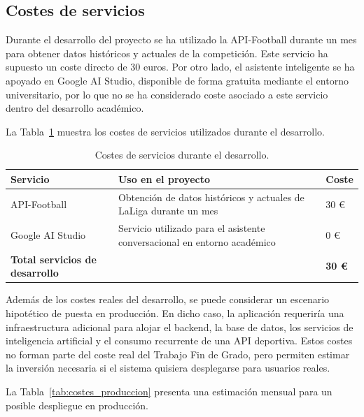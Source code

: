 \subsection{Costes de servicios}

Durante el desarrollo del proyecto se ha utilizado la API-Football durante un mes para obtener datos históricos y actuales de la competición. Este servicio ha supuesto un coste directo de 30 euros. Por otro lado, el asistente inteligente se ha apoyado en Google AI Studio, disponible de forma gratuita mediante el entorno universitario, por lo que no se ha considerado coste asociado a este servicio dentro del desarrollo académico.

La Tabla~\ref{tab:costes_servicios_desarrollo} muestra los costes de servicios utilizados durante el desarrollo.

\begin{table}[H]
\centering
\caption{Costes de servicios durante el desarrollo.}
\label{tab:costes_servicios_desarrollo}
\renewcommand{\arraystretch}{1.2}
\begin{tabular}{|p{6cm}|p{6cm}|p{3cm}|}
\hline
\textbf{Servicio} & \textbf{Uso en el proyecto} & \textbf{Coste} \\ \hline

API-Football &
Obtención de datos históricos y actuales de LaLiga durante un mes &
30 \euro \\ \hline

Google AI Studio &
Servicio utilizado para el asistente conversacional en entorno académico &
0 \euro \\ \hline

\textbf{Total servicios de desarrollo} &
&
\textbf{30 \euro} \\ \hline

\end{tabular}
\end{table}

Además de los costes reales del desarrollo, se puede considerar un escenario hipotético de puesta en producción. En dicho caso, la aplicación requeriría una infraestructura adicional para alojar el backend, la base de datos, los servicios de inteligencia artificial y el consumo recurrente de una API deportiva. Estos costes no forman parte del coste real del Trabajo Fin de Grado, pero permiten estimar la inversión necesaria si el sistema quisiera desplegarse para usuarios reales.

La Tabla~\ref{tab:costes_produccion} presenta una estimación mensual para un posible despliegue en producción.


